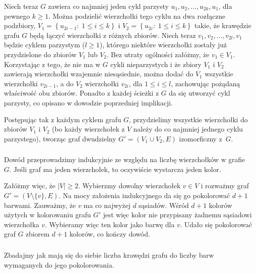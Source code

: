 Niech teraz $G$ zawiera co najmniej jeden cykl parzysty $u_1,u_2,\dots,u_{2k},u_1$, dla pewnego $k\ge 1$. Można podzielić wierzchołki tego cyklu na dwa rozłączne podzbiory, $V_1 = \left\{ u_{2i-1}:\;1\le i\le k\right\}$ i $V_2 = \left\{ u_{2i}:\;1\le i\le k\right\}$ takie, że krawędzie grafu $G$ będą łączyć wierzchołki z różnych zbiorów. Niech teraz $v_1,v_2,\dots,v_{2l},v_1$ będzie cyklem parzystym ($l\ge 1$), którego niektóre wierzchołki zostały już przydzielone do zbiorów $V_1$ lub $V_2$. Bez utraty ogólności załóżmy, że $v_1\in V_1$. Korzystając z tego, że nie ma w $G$ cykli nieparzystych i że zbiory $V_1$ i $V_2$ zawierają wierzchołki wzajemnie niesąsiednie, można dodać do $V_1$ wszystkie wierzchołki $v_{2i-1}$, a do $V_2$ wierzchołki $v_{2i}$, dla $1\le i\le l$, zachowując pożądaną właściwość obu zbiorów. Ponadto z każdej ścieżki z $G$ da się utworzyć cykl parzysty, co opisano w dowodzie poprzedniej implikacji.

Postępując tak z każdym cyklem grafu $G$, przydzielimy wszystkie wierzchołki do zbiorów $V_1$ i $V_2$ (bo każdy wierzchołek z $V$ należy do co najmniej jednego cyklu parzystego), tworząc graf dwudzielny $G'=(V_1\cup V_2,E)$ izomorficzny z~$G$.

\subsubsection{} %
Dowód przeprowadzimy indukcyjnie ze względu na liczbę wierzchołków w grafie $G$. Jeśli graf ma jeden wierzchołek, to oczywiście wystarcza jeden kolor.

Załóżmy więc, że $|V|\ge 2$. Wybierzmy dowolny wierzchołek $v\in V$ i rozważmy graf $G'=\left(V\setminus\{v\},E\right)$. Na mocy założenia indukcyjnego da się go pokolorować $d+1$ barwami. Zauważmy, że $v$ ma co najwyżej $d$ sąsiadów. Wśród $d+1$ kolorów użytych w kolorowaniu grafu $G'$ jest więc kolor nie przypisany żadnemu sąsiadowi wierzchołka $v$. Wybieramy więc ten kolor jako barwę dla $v$. Udało się pokolorować graf $G$ zbiorem $d+1$ kolorów, co kończy dowód.

\subsubsection{} %
Zbadajmy jak mają się do siebie liczba krawędzi grafu do liczby barw wymaganych do jego pokolorowania.

